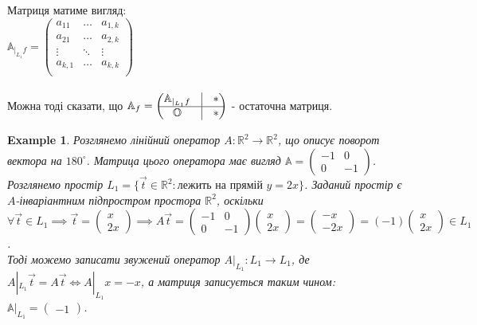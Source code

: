 \documentclass[a4paper, 10pt]{article}
\theoremstyle{theoremdd}
\newtheorem{example}[theorem]{Example}
\begin{document}
Матриця матиме вигляд:\\
$\mathbb{A}_{|_{L_1}f} = \begin{pmatrix}
a_{11} & \dots & a_{1,k}\\
a_{21} & \dots & a_{2,k}\\
\vdots & \ddots & \vdots\\
a_{k,1} & \dots & a_{k,k}\\
\end{pmatrix}$\\
\\
Можна тоді сказати, що 
$\mathbb{A}_f = \begin{pmatrix}
 \mathbb{A}_{|_{L_1}f}  & \vline & * \\
 \hline
 \mathbb{O} & \vline & *
\end{pmatrix}$ - остаточна матриця.


\begin{example}
Розглянемо лінійний оператор $A: \mathbb{R}^2 \to \mathbb{R}^2$, що описує поворот вектора на $180^\circ$. Матрица цього оператора має вигляд $\mathbb{A} = \begin{pmatrix}
-1 & 0 \\
0 & -1
\end{pmatrix}$.\\
Розглянемо простір $L_1 = \{ \vec{t} \in \mathbb{R}^2 : \text{лежить на прямій } y = 2x \}$. Заданий простір є $A$-інваріантним підпростром простора $\mathbb{R}^2$, оскільки\\
$\forall \vec{t} \in L_1 \implies \vec{t} = \begin{pmatrix}
x \\ 2x
\end{pmatrix} \implies A \vec{t} = \begin{pmatrix}
-1 & 0 \\
0 & -1
\end{pmatrix} \begin{pmatrix}
x \\ 2x
\end{pmatrix} = \begin{pmatrix}
-x \\ -2x
\end{pmatrix} = (-1) \begin{pmatrix}
x \\ 2x
\end{pmatrix} \in L_1$.\\
Тоді можемо записати звужений оператор $A|_{L_1}: L_1 \to L_1$, де $A|_{L_1} \vec{t} = A \vec{t} \iff A|_{L_1} x = -x$, а матриця записується таким чином:\\
$\mathbb{A}|_{L_1} = \begin{pmatrix}
-1
\end{pmatrix}$.\\
\end{example}
\end{document}
